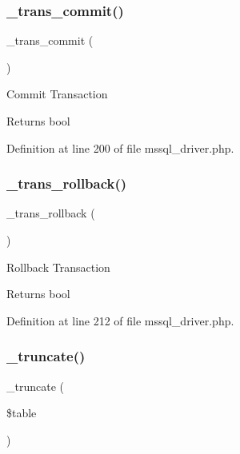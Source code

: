 \subsubsection{\texorpdfstring{\_trans\_commit()}{\_trans\_commit()}}
{\footnotesize\ttfamily \+\_\+trans\+\_\+commit (\begin{DoxyParamCaption}{ }\end{DoxyParamCaption})\hspace{0.3cm}{\ttfamily [protected]}}

Commit Transaction

\begin{DoxyReturn}{Returns}
bool 
\end{DoxyReturn}


Definition at line 200 of file mssql\+\_\+driver.\+php.

\mbox{\label{class_c_i___d_b__mssql__driver_ad49a116b0776c26b53114c9093fd102a}} 
\subsubsection{\texorpdfstring{\_trans\_rollback()}{\_trans\_rollback()}}
{\footnotesize\ttfamily \+\_\+trans\+\_\+rollback (\begin{DoxyParamCaption}{ }\end{DoxyParamCaption})\hspace{0.3cm}{\ttfamily [protected]}}

Rollback Transaction

\begin{DoxyReturn}{Returns}
bool 
\end{DoxyReturn}


Definition at line 212 of file mssql\+\_\+driver.\+php.

\mbox{\label{class_c_i___d_b__mssql__driver_aa029600528fc1ce660a23ff4b4667f95}} 
\subsubsection{\texorpdfstring{\_truncate()}{\_truncate()}}
{\footnotesize\ttfamily \+\_\+truncate (\begin{DoxyParamCaption}\item[{}]{\$table }\end{DoxyParamCaption})\hspace{0.3cm}{\ttfamily [protected]}}

